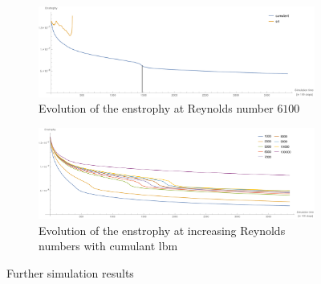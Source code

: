 \begin{figure}
\centering
\begin{subfigure}[b]{\textwidth}
  \centering
  \includegraphics[width=\textwidth]{../figures/vortexMerge_enstrophy6100.pdf}  %
  \caption{Evolution of the enstrophy at Reynolds number $6100$}
\label{fig: rankine 6000}
\end{subfigure}%

\medskip
\begin{subfigure}[b]{\textwidth}
  \centering
  \includegraphics[width=\textwidth]{../figures/vortexMerge_enstrophy_cumulants.pdf}  %
  \caption{Evolution of the enstrophy at increasing Reynolds numbers with cumulant \gls{lbm}}
\label{fig: rankine cumulant all}
\end{subfigure}
\caption{Further simulation results}
\label{fig: rankine further}
\end{figure}
